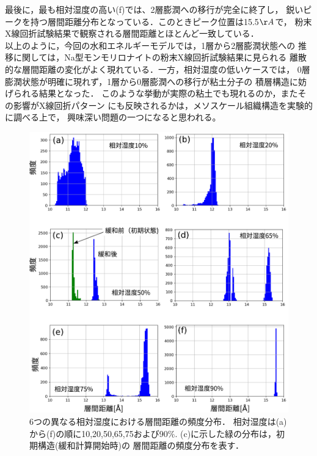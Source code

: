 最後に，最も相対湿度の高い(f)では、2層膨潤への移行が完全に終了し，
鋭いピークを持つ層間距離分布となっている．このときピーク位置は15.5$\AA$で，
粉末X線回折試験結果で観察される層間距離とほとんど一致している．\\
\hspace{\parindent}
以上のように，今回の水和エネルギーモデルでは，1層から2層膨潤状態への
推移に関しては，Na型モンモリロナイトの粉末X線回折試験結果に見られる
離散的な層間距離の変化がよく現れている．一方，相対湿度の低いケースでは，
0層膨潤状態が明確に現れず，1層から0層膨潤への移行が粘土分子の
積層構造に妨げられる結果となった．
このような挙動が実際の粘土でも現れるのか，またその影響がX線回折パターン
にも反映されるかは，メソスケール組織構造を実験的に調べる上で，
興味深い問題の一つになると思われる。
\begin{figure}[h]
	\begin{center}
	\includegraphics[width=1.0\linewidth]{Figs/fig5.pdf} 
	\end{center}
	\caption{
		6つの異なる相対湿度における層間距離の頻度分布．
		相対湿度は(a)から(f)の順に10,20,50,65,75および90$\%$. 
		(c)に示した緑の分布は，初期構造(緩和計算開始時)の
		層間距離の頻度分布を表す．
	} 
	\label{fig:fig5}
\end{figure}
